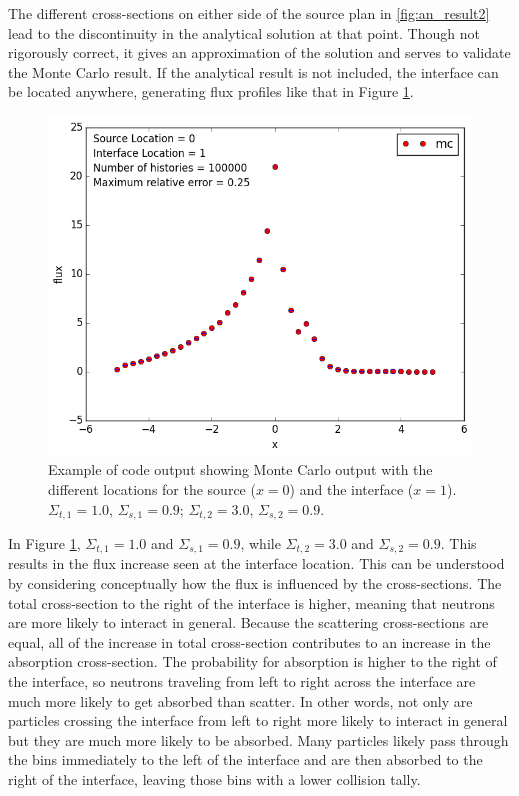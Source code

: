\documentclass[11pt, oneside]{article}   	%
\begin{document}
The different cross-sections on either side of the source plan in \ref{fig:an_result2} lead to the discontinuity in the analytical solution at that point. Though not rigorously correct, it gives an approximation of the solution and serves to validate the Monte Carlo result. If the analytical result is not included, the interface can be located anywhere, generating flux profiles like that in Figure \ref{fig:mc_result1}.

\begin{figure}
\centering
  \includegraphics[width=12cm, keepaspectratio,]{mc_result1}
   \caption{Example of code output showing Monte Carlo output with the different locations for the source ($x = 0$) and the interface ($x=1$). $\Sigma_{t,1}= 1.0$, $\Sigma_{s,1} = 0.9$; $\Sigma_{t,2}= 3.0$, $\Sigma_{s,2} = 0.9$.}
  \label{fig:mc_result1}
\end{figure}

In Figure \ref{fig:mc_result1}, $\Sigma_{t,1}= 1.0$ and $\Sigma_{s,1} = 0.9$, while $\Sigma_{t,2}= 3.0$ and $\Sigma_{s,2} = 0.9$. This results in the flux increase seen at the interface location. This can be understood by considering conceptually how the flux is influenced by the cross-sections. The total cross-section to the right of the interface is higher, meaning that neutrons are more likely to interact in general. Because the scattering cross-sections are equal, all of the increase in total cross-section contributes to an increase in the absorption cross-section. The probability for absorption is higher to the right of the interface, so neutrons traveling from left to right across the interface are much more likely to get absorbed than scatter. In other words, not only are particles crossing the interface from left to right more likely to interact in general but they are much more likely to be absorbed. Many particles likely pass through the bins immediately to the left of the interface and are then absorbed to the right of the interface, leaving those bins with a lower collision tally.
\end{document}
